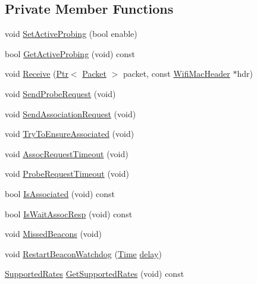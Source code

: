 \subsection*{Private Member Functions}
\begin{DoxyCompactItemize}
\item 
void \hyperlink{classns3_1_1StaWifiMac_acd68ef0ad1aec613b5ba224988d559ea}{Set\+Active\+Probing} (bool enable)
\item 
bool \hyperlink{classns3_1_1StaWifiMac_a0240efff344d1338961299fe2169f2c8}{Get\+Active\+Probing} (void) const 
\item 
void \hyperlink{classns3_1_1StaWifiMac_ac11352c9502acc4b612224fc172c28f8}{Receive} (\hyperlink{classns3_1_1Ptr}{Ptr}$<$ \hyperlink{classns3_1_1Packet}{Packet} $>$ packet, const \hyperlink{classns3_1_1WifiMacHeader}{Wifi\+Mac\+Header} $\ast$hdr)
\item 
void \hyperlink{classns3_1_1StaWifiMac_a2280584632094368d217112ceb2c4e44}{Send\+Probe\+Request} (void)
\item 
void \hyperlink{classns3_1_1StaWifiMac_a2cc593da25f98afa856f249d02cb38e0}{Send\+Association\+Request} (void)
\item 
void \hyperlink{classns3_1_1StaWifiMac_a545fb78eb8b89ee48512820e31d76a81}{Try\+To\+Ensure\+Associated} (void)
\item 
void \hyperlink{classns3_1_1StaWifiMac_a76c7409a492791cc1c3f35d779072371}{Assoc\+Request\+Timeout} (void)
\item 
void \hyperlink{classns3_1_1StaWifiMac_a5d436d0e8da0cfd8d7d3cd8013956efe}{Probe\+Request\+Timeout} (void)
\item 
bool \hyperlink{classns3_1_1StaWifiMac_a8579a33f94aed726f149cf5ef783e9b5}{Is\+Associated} (void) const 
\item 
bool \hyperlink{classns3_1_1StaWifiMac_a55e51f0f2e9485526e0c3d062bf2d518}{Is\+Wait\+Assoc\+Resp} (void) const 
\item 
void \hyperlink{classns3_1_1StaWifiMac_a973a8b9cda122dd3b22cda3c4073bcd1}{Missed\+Beacons} (void)
\item 
void \hyperlink{classns3_1_1StaWifiMac_a873848ee518a0190f8feb3551f3d5969}{Restart\+Beacon\+Watchdog} (\hyperlink{classns3_1_1Time}{Time} \hyperlink{mmwave_2model_2fading-traces_2fading__trace__generator_8m_a7964e6aa8f61a9d28973c8267a606ad8}{delay})
\item 
\hyperlink{classns3_1_1SupportedRates}{Supported\+Rates} \hyperlink{classns3_1_1StaWifiMac_abe67dfa143223ed5237c4083bb474883}{Get\+Supported\+Rates} (void) const 

\end{DoxyCompactItemize}
